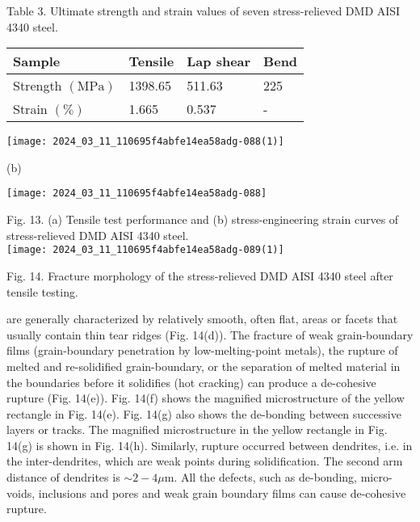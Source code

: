 \documentclass[10pt]{article}
\begin{document}
Table 3. Ultimate strength and strain values of seven stress-relieved DMD AISI 4340 steel.

\begin{center}
\begin{tabular}{llll}
\hline
Sample & Tensile & Lap shear & Bend \\
\hline
Strength $(\mathrm{MPa})$ & 1398.65 & 511.63 & 225 \\
Strain $(\%)$ & 1.665 & 0.537 & - \\
\hline
\end{tabular}
\end{center}

\begin{center}
\texttt{[image: 2024\_03\_11\_110695f4abfe14ea58adg-088(1)]}
\end{center}

(b)

\begin{center}
\texttt{[image: 2024\_03\_11\_110695f4abfe14ea58adg-088]}
\end{center}

Fig. 13. (a) Tensile test performance and (b) stress-engineering strain curves of stress-relieved DMD AISI 4340 steel.\\
\texttt{[image: 2024\_03\_11\_110695f4abfe14ea58adg-089(1)]}

Fig. 14. Fracture morphology of the stress-relieved DMD AISI 4340 steel after tensile testing.

are generally characterized by relatively smooth, often flat, areas or facets that usually contain thin tear ridges (Fig. 14(d)). The fracture of weak grain-boundary films (grain-boundary penetration by low-melting-point metals), the rupture of melted and re-solidified grain-boundary, or the separation of melted material in the boundaries before it solidifies (hot cracking) can produce a de-cohesive rupture (Fig. 14(e)). Fig. 14(f) shows the magnified microstructure of the yellow rectangle in Fig. 14(e). Fig. 14(g) also shows the de-bonding between successive layers or tracks. The magnified microstructure in the yellow rectangle in Fig. 14(g) is shown in Fig. 14(h). Similarly, rupture occurred between dendrites, i.e. in the inter-dendrites, which are weak points during solidification. The second arm distance of dendrites is $\sim 2-4 \mu \mathrm{m}$. All the defects, such as de-bonding, micro-voids, inclusions and pores and weak grain boundary films can cause de-cohesive rupture.
\end{document}
